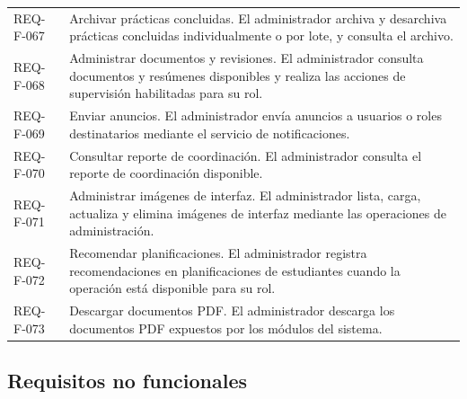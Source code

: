 \documentclass[11pt,a4paper]{article}
\begin{document}
{\begin{longtable}{@{}P{2.5cm}P{12.6cm}@{}}
REQ-F-067 & Archivar prácticas concluidas. El administrador archiva y desarchiva prácticas concluidas individualmente o por lote, y consulta el archivo.\\
REQ-F-068 & Administrar documentos y revisiones. El administrador consulta documentos y resúmenes disponibles y realiza las acciones de supervisión habilitadas para su rol.\\
REQ-F-069 & Enviar anuncios. El administrador envía anuncios a usuarios o roles destinatarios mediante el servicio de notificaciones.\\
REQ-F-070 & Consultar reporte de coordinación. El administrador consulta el reporte de coordinación disponible.\\
REQ-F-071 & Administrar imágenes de interfaz. El administrador lista, carga, actualiza y elimina imágenes de interfaz mediante las operaciones de administración.\\
REQ-F-072 & Recomendar planificaciones. El administrador registra recomendaciones en planificaciones de estudiantes cuando la operación está disponible para su rol.\\
REQ-F-073 & Descargar documentos PDF. El administrador descarga los documentos PDF expuestos por los módulos del sistema.\\
\end{longtable}
}
\subsection{Requisitos no funcionales}
\end{document}

